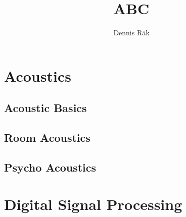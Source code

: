 \documentclass{book}
\author{Dennis Räk}
\title{ABC}
\date{}
\begin{document}
\part{Acoustics}
    \chapter{Acoustic Basics}
    \chapter{Room Acoustics}
    \chapter{Psycho Acoustics}

\part{Digital Signal Processing}
\end{document}
